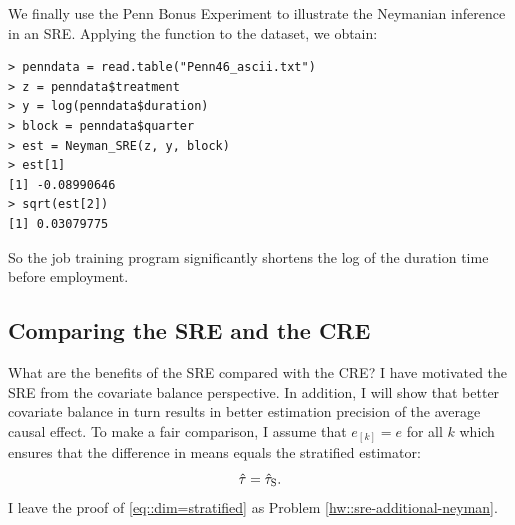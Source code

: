 We finally use the Penn Bonus Experiment to illustrate the Neymanian inference in an SRE. 
Applying the function  to the dataset, we obtain:
\begin{lstlisting}
> penndata = read.table("Penn46_ascii.txt")
> z = penndata$treatment
> y = log(penndata$duration)
> block = penndata$quarter
> est = Neyman_SRE(z, y, block)
> est[1]
[1] -0.08990646
> sqrt(est[2])
[1] 0.03079775
\end{lstlisting} 
So the job training program significantly shortens the log of the duration time before employment. 


\subsection{Comparing the SRE and the CRE}

What are the benefits of the SRE compared with the CRE?  I have motivated the SRE from the covariate balance perspective. In addition, I will show that better covariate balance in turn results in better estimation precision of the average causal effect. To make a fair comparison, I assume that $e_{[k]} = e$ for all $k$ which ensures that the difference in means equals the stratified estimator: 
\begin{equation}
\label{eq::dim=stratified}
\hat{\tau} = \hat{\tau}_\textsc{S}.
\end{equation}
I leave the proof of \eqref{eq::dim=stratified} as Problem \ref{hw::sre-additional-neyman}. 





